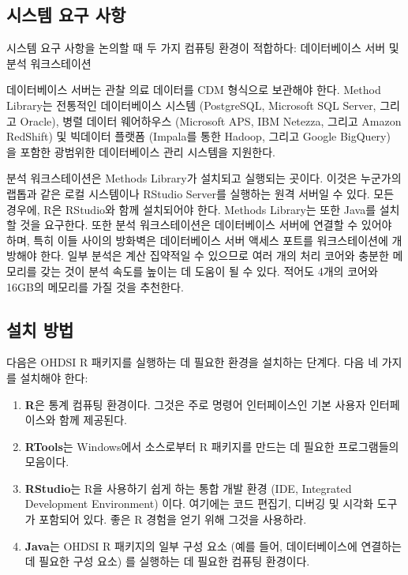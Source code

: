 \documentclass[11pt]{book}
\providecommand{\tightlist}{%
  \setlength{\itemsep}{0pt}\setlength{\parskip}{0pt}}
\theoremstyle{definition}
\theoremstyle{definition}
\theoremstyle{definition}
\theoremstyle{remark}
\begin{document}
\subsection{시스템 요구 사항}\label{--}

시스템 요구 사항을 논의할 때 두 가지 컴퓨팅 환경이 적합하다:
데이터베이스 서버 및 분석 워크스테이션 

데이터베이스 서버는 관찰 의료 데이터를 CDM 형식으로 보관해야 한다.
Method Library는 전통적인 데이터베이스 시스템 (PostgreSQL, Microsoft SQL
Server, 그리고 Oracle), 병렬 데이터 웨어하우스 (Microsoft APS, IBM
Netezza, 그리고 Amazon RedShift) 및 빅데이터 플랫폼 (Impala를 통한
Hadoop, 그리고 Google BigQuery) 을 포함한 광범위한 데이터베이스 관리
시스템을 지원한다.

분석 워크스테이션은 Methods Library가 설치되고 실행되는 곳이다. 이것은
누군가의 랩톱과 같은 로컬 시스템이나 RStudio Server를 실행하는 원격
서버일 수 있다. 모든 경우에, R은 RStudio와 함께 설치되어야 한다. Methods
Library는 또한 Java를 설치할 것을 요구한다. 또한 분석 워크스테이션은
데이터베이스 서버에 연결할 수 있어야 하며, 특히 이들 사이의 방화벽은
데이터베이스 서버 액세스 포트를 워크스테이션에 개방해야 한다. 일부
분석은 계산 집약적일 수 있으므로 여러 개의 처리 코어와 충분한 메모리를
갖는 것이 분석 속도를 높이는 데 도움이 될 수 있다. 적어도 4개의 코어와
16GB의 메모리를 가질 것을 추천한다.

\subsection{설치 방법}\label{installR}

다음은 OHDSI R 패키지를 실행하는 데 필요한 환경을 설치하는 단계다. 다음
네 가지를 설치해야 한다: 

\begin{enumerate}
\def\labelenumi{\arabic{enumi}.}
\tightlist
\item
  \textbf{R}은 통계 컴퓨팅 환경이다. 그것은 주로 명령어 인터페이스인
  기본 사용자 인터페이스와 함께 제공된다.
\item
  \textbf{RTools}는 Windows에서 소스로부터 R 패키지를 만드는 데 필요한
  프로그램들의 모음이다.
\item
  \textbf{RStudio}는 R을 사용하기 쉽게 하는 통합 개발 환경 (IDE,
  Integrated Development Environment) 이다. 여기에는 코드 편집기, 디버깅
  및 시각화 도구가 포함되어 있다. 좋은 R 경험을 얻기 위해 그것을
  사용하라.
\item
  \textbf{Java}는 OHDSI R 패키지의 일부 구성 요소 (예를 들어,
  데이터베이스에 연결하는 데 필요한 구성 요소) 를 실행하는 데 필요한
  컴퓨팅 환경이다.
\end{enumerate}
\end{document}
